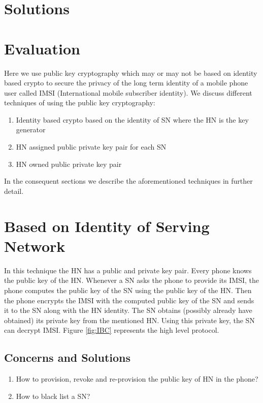 \documentclass[lnicst,sechang,a4paper]{svmultln}
\begin{document}
\section{Solutions}\label{sec:solutions}

\section{Evaluation} \label{sec:evaluation}


Here we use public key cryptography which may or may not be based on identity based crypto to secure the privacy of the long term identity of a mobile phone user called IMSI (International mobile subscriber identity). We discuss different techniques of using the public key cryptography:

\begin{enumerate}
\item Identity based crypto based on the identity of SN where the HN is the key generator
\item HN assigned public private key pair for each SN
\item HN owned public private key pair
\end{enumerate}

In the consequent sections we describe the aforementioned techniques in further detail.

\section{Based on Identity of Serving Network} In this technique the HN has a public and private key pair. Every phone knows the public key of the HN. Whenever a SN asks the phone to provide its IMSI, the phone computes the public key of the SN using the public key of the HN. Then the phone encrypts the IMSI with the computed public key of the SN and sends it to the SN along with the HN identity. The SN obtains (possibly already have obtained) its private key from the mentioned HN. Using this private key, the SN can decrypt IMSI. Figure \ref{fig:IBC} represents the high level protocol.

\subsection{Concerns and Solutions}
\begin{enumerate}
\item How to provision, revoke and re-provision the public key of HN in the phone?
\item How to black list a SN?
\end{enumerate}
\end{document}
